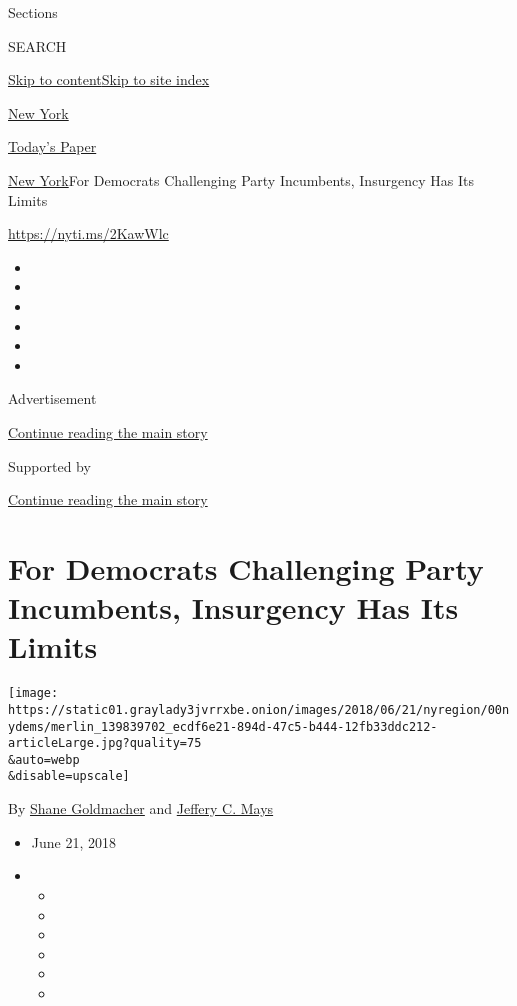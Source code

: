 Sections

SEARCH

\protect\hyperlink{site-content}{Skip to
content}\protect\hyperlink{site-index}{Skip to site index}

\href{https://www.nytimes3xbfgragh.onion/section/nyregion}{New York}

\href{https://myaccount.nytimes3xbfgragh.onion/auth/login?response_type=cookie\&client_id=vi}{}

\href{https://www.nytimes3xbfgragh.onion/section/todayspaper}{Today's
Paper}

\href{/section/nyregion}{New York}\textbar{}For Democrats Challenging
Party Incumbents, Insurgency Has Its Limits

\url{https://nyti.ms/2KawWlc}

\begin{itemize}
\item
\item
\item
\item
\item
\item
\end{itemize}

Advertisement

\protect\hyperlink{after-top}{Continue reading the main story}

Supported by

\protect\hyperlink{after-sponsor}{Continue reading the main story}

\hypertarget{for-democrats-challenging-party-incumbents-insurgency-has-its-limits}{%
\section{For Democrats Challenging Party Incumbents, Insurgency Has Its
Limits}\label{for-democrats-challenging-party-incumbents-insurgency-has-its-limits}}

\texttt{[image: https://static01.graylady3jvrrxbe.onion/images/2018/06/21/nyregion/00nydems/merlin\_139839702\_ecdf6e21-894d-47c5-b444-12fb33ddc212-articleLarge.jpg?quality=75\\\&auto=webp\\\&disable=upscale]}

By \href{https://www.nytimes3xbfgragh.onion/by/shane-goldmacher}{Shane
Goldmacher} and
\href{https://www.nytimes3xbfgragh.onion/by/jeffery-c-mays}{Jeffery C.
Mays}

\begin{itemize}
\item
  June 21, 2018
\item
  \begin{itemize}
  \item
  \item
  \item
  \item
  \item
  \item
  \end{itemize}
\end{itemize}


